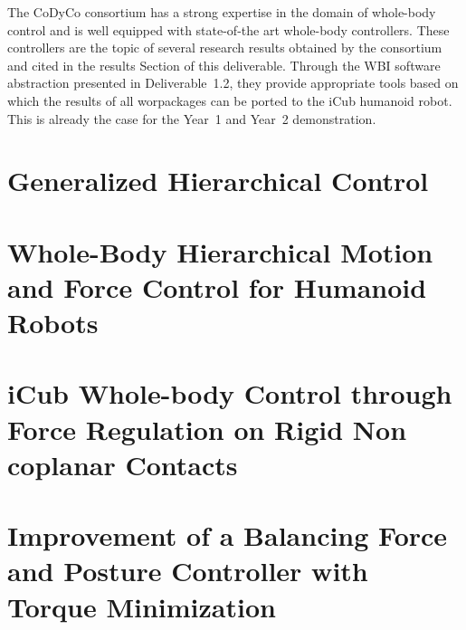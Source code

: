 \documentclass[12pt,a4paper,twoside]{article}
\begin{document}
The CoDyCo consortium has a strong expertise in the domain of whole-body control and is well equipped with state-of-the art whole-body controllers. These controllers are the topic of several research results obtained by the consortium and cited in the results Section of this deliverable. Through the WBI software abstraction presented in Deliverable~1.2, they provide appropriate tools based on which the results of all worpackages can be ported to the iCub humanoid robot. This is already the case for the Year~1 and Year~2 demonstration. 





\newpage{}




\newpage{}
\begin{appendices}
\appendices

\section{Generalized Hierarchical Control}
\label{app:GHC}
\newpage


\section{Whole-Body Hierarchical Motion and Force Control for Humanoid Robots}
\label{app:LiuAutRob2014SI}
\newpage


\section{iCub Whole-body Control through Force Regulation on Rigid Non coplanar Contacts}
\label{app:NoriFRAI2015}
\newpage


\section{Improvement of a Balancing Force and Posture Controller with Torque Minimization}
\label{app:report Arslan}
\newpage


\end{appendices}
\end{document}
